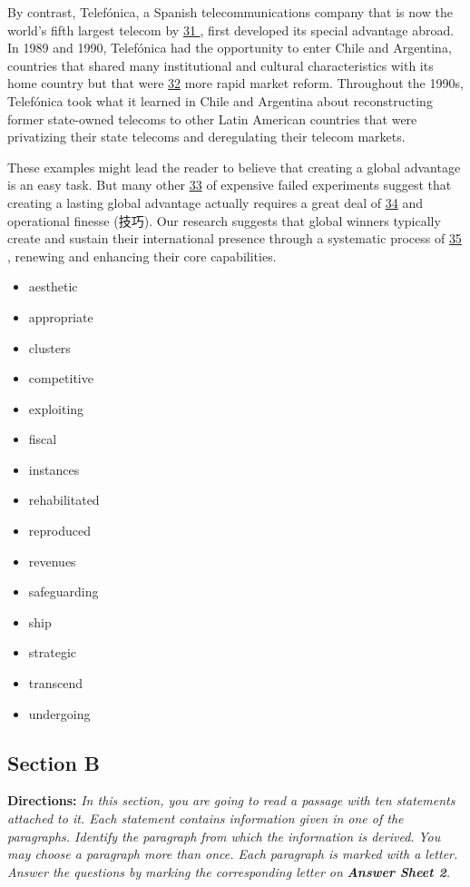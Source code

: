 \documentclass[UTF8,11pt]{ctexart}
\begin{document}
By contrast, Telefónica, a Spanish telecommunications company that is now the world’s fifth largest telecom by \uline{31 }, first developed its special advantage abroad. In 1989 and 1990, Telefónica had the opportunity to enter Chile and Argentina, countries that shared many institutional and cultural characteristics with its home country but that were \uline{32} more rapid market reform. Throughout the 1990s, Telefónica took what it learned in Chile and Argentina about reconstructing former state-owned telecoms to other Latin American countries that were privatizing their state telecoms and deregulating their telecom markets.


These examples might lead the reader to believe that creating a global advantage is an easy task. But many other \uline{33} of expensive failed experiments suggest that creating a lasting global advantage actually requires a great deal of \uline{34} and operational finesse (技巧). Our research suggests that global winners typically create and sustain their international presence through a systematic process of \uline{35 }, renewing and enhancing their core capabilities.


\begin{itemize}[leftmargin=2em,itemsep=.2em,topsep=.4em]\item[A.] aesthetic
\item[B.] appropriate
\item[C.] clusters
\item[D.] competitive
\item[E.] exploiting
\item[F.] fiscal
\item[G.] instances
\item[H.] rehabilitated
\item[I.] reproduced
\item[J.] revenues
\item[K.] safeguarding
\item[L.] ship
\item[M.] strategic
\item[N.] transcend
\item[O.] undergoing
\end{itemize}

\subsection*{\textbf{Section B}}


\textbf{Directions:} \textit{In this section, you are going to read a passage with ten statements attached to it. Each statement} \textit{contains information given in one of the paragraphs. Identify the paragraph from which the information is derived.} \textit{You may choose a paragraph more than once. Each paragraph is marked with a letter. Answer the questions by} \textit{marking the corresponding letter on }\textbf{\textit{Answer Sheet 2}}\textit{.}
\end{document}
